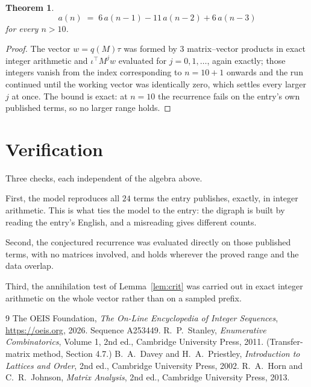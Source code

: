 \documentclass[11pt,a4paper]{article}
\theoremstyle{plain}
\newtheorem{theorem}{Theorem}
\theoremstyle{definition}
\begin{document}
\begin{theorem}
\[
a(n)\;=\;6\,a(n-1) - 11\,a(n-2) + 6\,a(n-3)
\]
for every $n>10$.
\end{theorem}

\begin{proof}
The vector $w=q(M)\tau$ was formed by $3$ matrix--vector products in exact integer
arithmetic and $\iota^{\!\top}M^{j}w$ evaluated for $j=0,1,\dots$, again exactly; those
integers vanish from the index corresponding to $n=10+1$ onwards and the run continued
until the working vector was identically zero, which settles every larger $j$ at once. The bound is exact: at $n=10$ the recurrence fails on the entry's own published terms, so no larger range holds.
\end{proof}

\section{Verification}

Three checks, each independent of the algebra above.

First, the model reproduces all $24$ terms the entry publishes, exactly, in integer
arithmetic. This is what ties the model to the entry: the digraph is built by reading the
entry's English, and a misreading gives different counts.

Second, the conjectured recurrence was evaluated directly on those published terms, with no
matrices involved, and holds wherever the proved range and the data overlap.

Third, the annihilation test of Lemma~\ref{lem:crit} was carried out in exact integer
arithmetic on the whole vector rather than on a sampled prefix.

\begin{thebibliography}{9}
 The OEIS Foundation, \emph{The On-Line Encyclopedia of Integer
Sequences}, \url{https://oeis.org}, 2026. Sequence A253449.
 R.~P.~Stanley, \emph{Enumerative Combinatorics}, Volume 1, 2nd ed.,
Cambridge University Press, 2011. (Transfer-matrix method, Section 4.7.)
 B.~A.~Davey and H.~A.~Priestley, \emph{Introduction to Lattices and
Order}, 2nd ed., Cambridge University Press, 2002.
 R.~A.~Horn and C.~R.~Johnson, \emph{Matrix Analysis}, 2nd ed., Cambridge
University Press, 2013.
\end{thebibliography}
\end{document}
